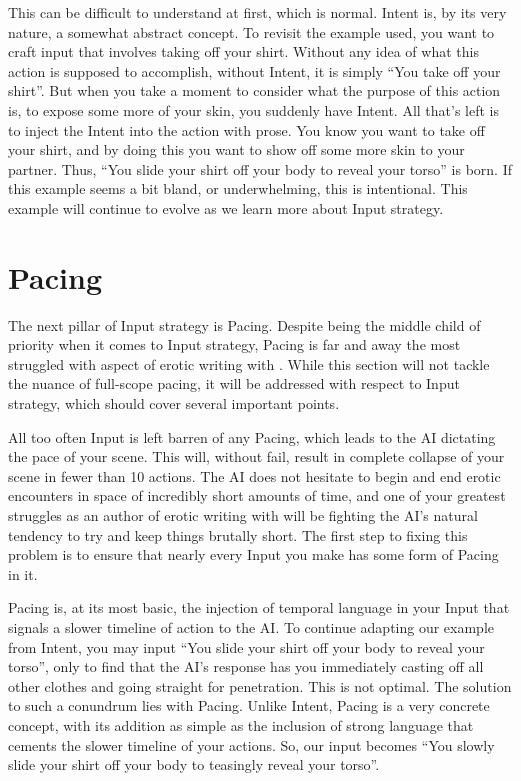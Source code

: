 \documentclass[Source-main.tex]{subfiles}
\begin{document}
This can be difficult to understand at first, which is normal.
Intent is, by its very nature, a somewhat abstract concept.
To revisit the example used, you want to craft input that involves taking off your shirt.
Without any idea of what this action is supposed to accomplish, without Intent, it is simply “You take off your shirt”.
But when you take a moment to consider what the purpose of this action is, to expose some more of your skin, you suddenly have Intent.
All that’s left is to inject the Intent into the action with prose.
You know you want to take off your shirt, and by doing this you want to show off some more skin to your partner.
Thus, “You slide your shirt off your body to reveal your torso” is born.
If this example seems a bit bland, or underwhelming, this is intentional.
This example will continue to evolve as we learn more about Input strategy.

\section{Pacing}

The next pillar of Input strategy is Pacing.
Despite being the middle child of priority when it comes to Input strategy, Pacing is far and away the most struggled with aspect of erotic writing with \aid.
While this section will not tackle the nuance of full-scope pacing, it will be addressed with respect to Input strategy, which should cover several important points.

All too often Input is left barren of any Pacing, which leads to the AI dictating the pace of your scene.
This will, without fail, result in complete collapse of your scene in fewer than 10 actions.
The AI does not hesitate to begin and end erotic encounters in space of incredibly short amounts of time, and one of your greatest struggles as an author of erotic writing with \aid will be fighting the AI’s natural tendency to try and keep things brutally short.
The first step to fixing this problem is to ensure that nearly every Input you make has some form of Pacing in it.

Pacing is, at its most basic, the injection of temporal language in your Input that signals a slower timeline of action to the AI.
To continue adapting our example from Intent, you may input “You slide your shirt off your body to reveal your torso”, only to find that the AI’s response has you immediately casting off all other clothes and going straight for penetration.
This is not optimal.
The solution to such a conundrum lies with Pacing.
Unlike Intent, Pacing is a very concrete concept, with its addition as simple as the inclusion of strong language that cements the slower timeline of your actions.
So, our input becomes “You slowly slide your shirt off your body to teasingly reveal your torso”.
\end{document}
